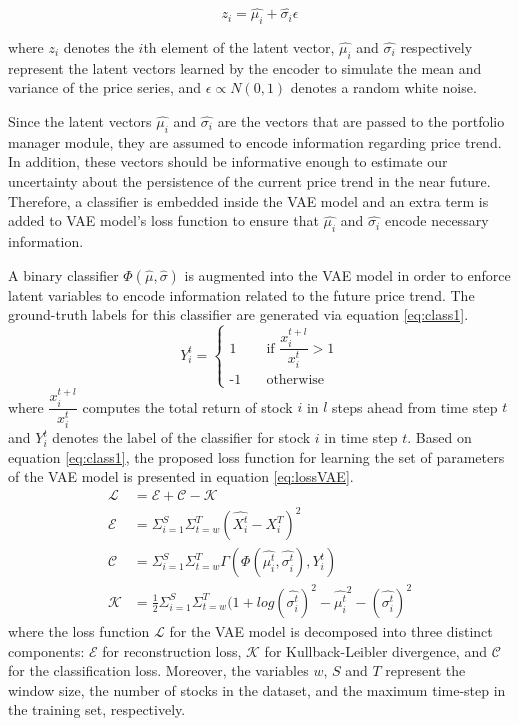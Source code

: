 \begin{equation}
	z_i = \hat{\mu_i} + \hat{\sigma_i} \epsilon
	\label{eq:beta-vae}
\end{equation}

where $z_i$ denotes the $i$th element of the latent vector, $\hat{\mu_i}$ and $\hat{\sigma_i}$ respectively represent the latent vectors learned by the encoder to simulate the mean and variance of the price series, and $\epsilon \propto N(0, 1)$ denotes a random white noise.

Since the latent vectors $\hat{\mu_i}$ and $\hat{\sigma_i}$ are the vectors that are passed to the portfolio manager module, they are assumed to encode information regarding price trend. In addition, these vectors should be informative enough to estimate our uncertainty about the persistence of the current price trend in the near future. Therefore, a classifier is embedded inside the VAE model and an extra term is added to VAE model's loss function to ensure that $\hat{\mu_i}$ and $\hat{\sigma_i}$ encode necessary information.

A binary classifier $\Phi(\hat{\mu}, \hat{\sigma})$ is augmented into the VAE model in order to enforce latent variables to encode information related to the future price trend. The ground-truth labels for this classifier are generated via equation \eqref{eq:class1}.
\begin{equation}
	Y_i^t = 
	\begin{cases}
	\text{1} &\quad\text{if } \dfrac{x_i^{t+l}}{x_i^t} > 1\\
	\text{-1} &\quad\text{otherwise}
	\end{cases}
	\label{eq:class1}
\end{equation}
where $\dfrac{x_i^{t+l}}{x_i^t}$ computes the total return of stock $i$ in $l$ steps ahead from time step $t$ and $Y_i^t$ denotes the label of the classifier for stock $i$ in time step $t$. Based on equation \eqref{eq:class1}, the proposed loss function for learning the set of parameters of the VAE model is presented in equation \eqref{eq:lossVAE}.
\begin{align}
	\mathcal{L} &= \mathcal{E}  + \mathcal{C} - \mathcal{K}	\label{eq:lossVAE}  \\
	\mathcal{E} &= \Sigma_{i=1}^S \Sigma_{t=w}^T (\hat{X_i^t} - X_i^T) ^ 2 	\label{eq:lossVAE2} \\
	\mathcal{C} &= \Sigma_{i=1}^S \Sigma_{t=w}^T \Gamma(\Phi(\hat{\mu_i^t}, \hat{\sigma_i^t}), Y_i^t) 	\label{eq:lossVAE3} \\
	\mathcal{K} &= \frac{1}{2} \Sigma_{i=1}^S \Sigma_{t=w}^T (1 + log(\hat{\sigma_i^t})^2 - \hat{\mu_i^t}^2 - (\hat{\sigma_i^t})^2 	\label{eq:lossVAE1} 
\end{align}
where the loss function $\mathcal{L}$ for the VAE model is decomposed into three distinct components: $\mathcal{E}$ for reconstruction loss, $\mathcal{K}$ for Kullback-Leibler divergence, and $\mathcal{C}$ for the classification loss. Moreover, the variables $w$, $S$ and $T$ represent the window size, the number of stocks in the dataset, and the maximum time-step in the training set, respectively.

